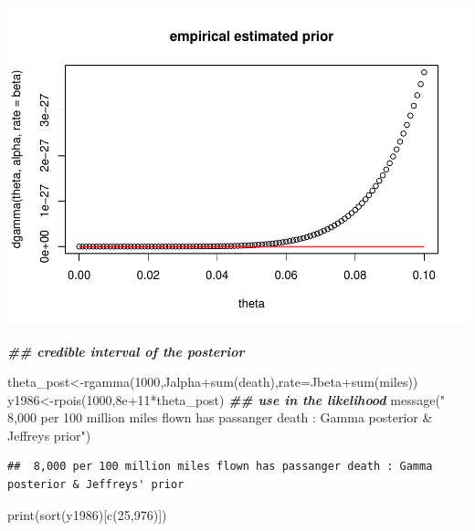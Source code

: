 \documentclass[
]{book}
\newenvironment{Shaded}{\begin{snugshade}}{\end{snugshade}}
\newcommand{\AttributeTok}[1]{\textcolor[rgb]{0.77,0.63,0.00}{#1}}
\newcommand{\DecValTok}[1]{\textcolor[rgb]{0.00,0.00,0.81}{#1}}
\newcommand{\DocumentationTok}[1]{\textcolor[rgb]{0.56,0.35,0.01}{\textbf{\textit{#1}}}}
\newcommand{\FloatTok}[1]{\textcolor[rgb]{0.00,0.00,0.81}{#1}}
\newcommand{\FunctionTok}[1]{\textcolor[rgb]{0.00,0.00,0.00}{#1}}
\newcommand{\NormalTok}[1]{#1}
\newcommand{\OtherTok}[1]{\textcolor[rgb]{0.56,0.35,0.01}{#1}}
\newcommand{\SpecialCharTok}[1]{\textcolor[rgb]{0.00,0.00,0.00}{#1}}
\newcommand{\StringTok}[1]{\textcolor[rgb]{0.31,0.60,0.02}{#1}}
\theoremstyle{definition}
\theoremstyle{definition}
\theoremstyle{definition}
\theoremstyle{definition}
\theoremstyle{remark}
\begin{document}
\includegraphics{_main_files/figure-latex/unnamed-chunk-27-2.pdf}

\begin{Shaded}
\begin{Highlighting}[]
 \DocumentationTok{\#\# credible interval of the posterior}


\NormalTok{ theta\_post}\OtherTok{\textless{}{-}}\FunctionTok{rgamma}\NormalTok{(}\DecValTok{1000}\NormalTok{,Jalpha}\SpecialCharTok{+}\FunctionTok{sum}\NormalTok{(death),}\AttributeTok{rate=}\NormalTok{Jbeta}\SpecialCharTok{+}\FunctionTok{sum}\NormalTok{(miles))}
\NormalTok{  y1986}\OtherTok{\textless{}{-}}\FunctionTok{rpois}\NormalTok{(}\DecValTok{1000}\NormalTok{,}\FloatTok{8e+11}\SpecialCharTok{*}\NormalTok{theta\_post) }\DocumentationTok{\#\# use in the likelihood}
  \FunctionTok{message}\NormalTok{(}\StringTok{" 8,000 per 100 million miles flown has passanger death : Gamma posterior \& Jeffreys\textquotesingle{} prior"}\NormalTok{)}
\end{Highlighting}
\end{Shaded}

\begin{verbatim}
##  8,000 per 100 million miles flown has passanger death : Gamma posterior & Jeffreys' prior
\end{verbatim}

\begin{Shaded}
\begin{Highlighting}[]
 \FunctionTok{print}\NormalTok{(}\FunctionTok{sort}\NormalTok{(y1986)[}\FunctionTok{c}\NormalTok{(}\DecValTok{25}\NormalTok{,}\DecValTok{976}\NormalTok{)])}
\end{Highlighting}
\end{Shaded}
\end{document}
